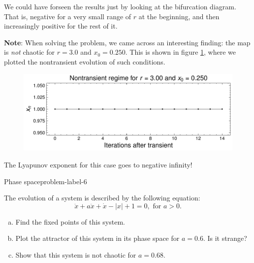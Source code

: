 \begin{enumerate}[(a)]
    We could have forseen the results just by looking at the bifurcation diagram. That is, negative
    for a very small range of $r$ at the beginning, and then increasingly positive for the rest
    of it.


    \textbf{Note}: When solving the problem, we came across an interesting finding: the map
    is \textit{not} chaotic for $r = 3.0$ and $x_0 = 0.250$. This is shown in figure \ref{fig:5c}, where
    we plotted the nontransient evolution of such conditions.

    \begin{figure}[!ht]
        \centering
        \includegraphics[scale=0.75]{images/not-chaotic.pdf}
        \label{fig:5c}
    \end{figure}

    The Lyapunov exponent for this case goes to negative infinity!


\end{enumerate}

\begin{problem}{Phase space}{problem-label-6}

    The evolution of a system is described by the following equation:
    \[
        \ddot{x} + a\ddot{x}+\dot{x}-|x|+1=0, \text{ for } a > 0.
    \]

    \begin{enumerate}[(a)]
        \item Find the fixed points of this system.
        \item Plot the attractor of this system in its phase space for $a = 0.6$.
        Is it strange?
        \item Show that this system is not chaotic for $a = 0.68$.
    \end{enumerate}

\end{problem}

